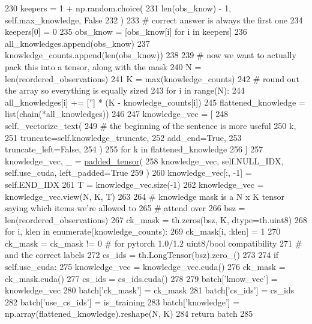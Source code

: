 \begin{DoxyCode}
230                 keepers = 1 + np.random.choice(
231                     len(obs\_know) - 1, self.max\_knowledge, \textcolor{keyword}{False}
232                 )
233                 \textcolor{comment}{# correct answer is always the first one}
234                 keepers[0] = 0
235                 obs\_know = [obs\_know[i] \textcolor{keywordflow}{for} i \textcolor{keywordflow}{in} keepers]
236             all\_knowledges.append(obs\_know)
237             knowledge\_counts.append(len(obs\_know))
238 
239         \textcolor{comment}{# now we want to actually pack this into a tensor, along with the mask}
240         N = len(reordered\_observations)
241         K = max(knowledge\_counts)
242         \textcolor{comment}{# round out the array so everything is equally sized}
243         \textcolor{keywordflow}{for} i \textcolor{keywordflow}{in} range(N):
244             all\_knowledges[i] += [\textcolor{stringliteral}{''}] * (K - knowledge\_counts[i])
245         flattened\_knowledge = list(chain(*all\_knowledges))
246 
247         knowledge\_vec = [
248             self.\_vectorize\_text(
249                 \textcolor{comment}{# the beginning of the sentence is more useful}
250                 k,
251                 truncate=self.knowledge\_truncate,
252                 add\_end=\textcolor{keyword}{True},
253                 truncate\_left=\textcolor{keyword}{False},
254             )
255             \textcolor{keywordflow}{for} k \textcolor{keywordflow}{in} flattened\_knowledge
256         ]
257         knowledge\_vec, \_ = \hyperlink{namespaceparlai_1_1agents_1_1legacy__agents_1_1seq2seq_1_1utils__v1_adb5a414ae439f14c54e8c760b91cc4c8}{padded\_tensor}(
258             knowledge\_vec, self.NULL\_IDX, self.use\_cuda, left\_padded=\textcolor{keyword}{True}
259         )
260         knowledge\_vec[:, -1] = self.END\_IDX
261         T = knowledge\_vec.size(-1)
262         knowledge\_vec = knowledge\_vec.view(N, K, T)
263 
264         \textcolor{comment}{# knowledge mask is a N x K tensor saying which items we're allowed to}
265         \textcolor{comment}{# attend over}
266         bsz = len(reordered\_observations)
267         ck\_mask = th.zeros(bsz, K, dtype=th.uint8)
268         \textcolor{keywordflow}{for} i, klen \textcolor{keywordflow}{in} enumerate(knowledge\_counts):
269             ck\_mask[i, :klen] = 1
270         ck\_mask = ck\_mask != 0  \textcolor{comment}{# for pytorch 1.0/1.2 uint8/bool compatibility}
271         \textcolor{comment}{# and the correct labels}
272         cs\_ids = th.LongTensor(bsz).zero\_()
273 
274         \textcolor{keywordflow}{if} self.use\_cuda:
275             knowledge\_vec = knowledge\_vec.cuda()
276             ck\_mask = ck\_mask.cuda()
277             cs\_ids = cs\_ids.cuda()
278 
279         batch[\textcolor{stringliteral}{'know\_vec'}] = knowledge\_vec
280         batch[\textcolor{stringliteral}{'ck\_mask'}] = ck\_mask
281         batch[\textcolor{stringliteral}{'cs\_ids'}] = cs\_ids
282         batch[\textcolor{stringliteral}{'use\_cs\_ids'}] = is\_training
283         batch[\textcolor{stringliteral}{'knowledge'}] = np.array(flattened\_knowledge).reshape(N, K)
284         \textcolor{keywordflow}{return} batch
285 
\end{DoxyCode}
